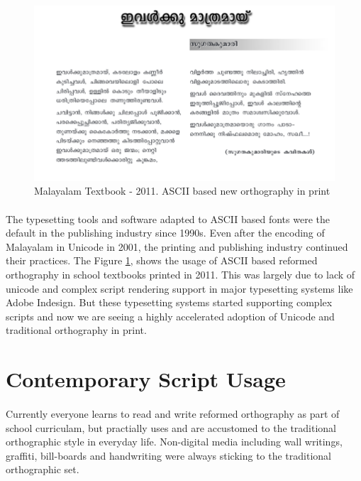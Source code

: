 \documentclass[10pt]{article}
\begin{document}
\begin{figure}[H]
	\centering
	\includegraphics[scale=0.5]{images/2011-Malayalam-Textbook.png}
	\caption{Malayalam Textbook - 2011. ASCII based new orthography in print}
	\label{textbook2011}
\end{figure}

\paragraph{}
The typesetting tools and software adapted to ASCII based fonts were the default in the publishing industry since 1990s. Even after the encoding of Malayalam in Unicode in 2001, the printing and publishing industry continued their practices. The Figure \ref{textbook2011}, shows the usage of ASCII based reformed orthography in school textbooks printed in 2011. This was largely due to lack of unicode and complex script rendering support in major typesetting systems like Adobe Indesign. But these typesetting systems started supporting complex scripts and now we are seeing a highly accelerated adoption of Unicode and traditional orthography in print.

\section{Contemporary Script Usage}

 \paragraph{}
Currently everyone learns to read and write reformed orthography as part of school curriculam, but practially uses and are accustomed to  the traditional orthographic style in everyday life. Non-digital media including wall writings, graffiti, bill-boards and handwriting were always sticking to the traditional orthographic set. 
\end{document}
